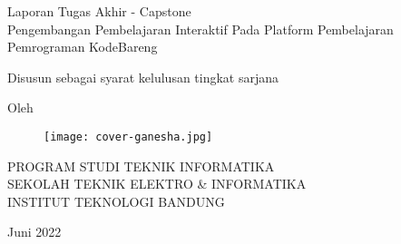 \clearpage
\pagestyle{empty}

\begin{center}
  \smallskip

  \Large \bfseries \MakeUppercase{\thetitle}
  \vfill

  \Large Laporan Tugas Akhir - Capstone \\
  Pengembangan Pembelajaran Interaktif Pada Platform Pembelajaran Pemrograman KodeBareng
  \vfill

  \large Disusun sebagai syarat kelulusan tingkat sarjana
  \vfill

  \large Oleh

  \Large \theauthor

  \vfill
  \begin{figure}[!h]
    \centering
    \texttt{[image: cover-ganesha.jpg]}
  \end{figure}
  \vfill

  \large
  \uppercase{
    Program Studi Teknik Informatika \\
    Sekolah Teknik Elektro \& Informatika \\
    Institut Teknologi Bandung
  }

  Juni 2022

\end{center}

\clearpage
